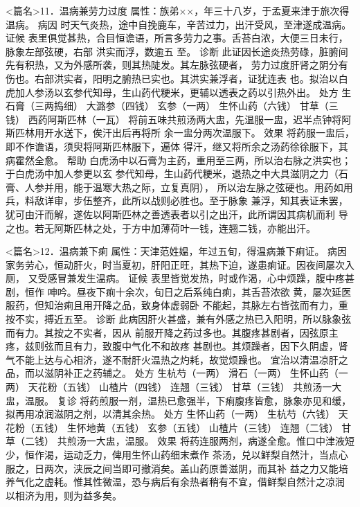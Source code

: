 \documentclass[a4paper,12pt,UTF8,twoside]{ctexbook}
\begin{document}
<篇名>11．温病兼劳力过度
属性：族弟××，年三十八岁，于孟夏来津于旅次得温病。 
病因 时天气炎热，途中自挽鹿车，辛苦过力，出汗受风，至津遂成温病。 
证候 表里俱觉甚热，合目恒谵语，所言多劳力之事。舌苔白浓，大便三日未行，脉象左部弦硬，右部 
洪实而浮，数逾五 
至。 
诊断 此证因长途炎热劳碌，脏腑间先有积热，又为外感所袭，则其热陡发。其左脉弦硬者， 
劳力过度肝肾之阴分有伤也。右部洪实者，阳明之腑热已实也。其洪实兼浮者，证犹连表 
也。拟治以白虎加人参汤以玄参代知母，生山药代粳米，更辅以透表之药以引热外出。 
处方 生石膏（三两捣细） 大潞参（四钱） 玄参（一两） 生怀山药（六钱） 
甘草（三钱） 西药阿斯匹林（一瓦） 
将前五味共煎汤两大盅，先温服一盅，迟半点钟将阿斯匹林用开水送下，俟汗出后再将所 
余一盅分两次温服下。 
效果 将药服一盅后，即不作谵语，须臾将阿斯匹林服下，遍体 
得汗，继又将所余之汤药徐徐服下，其病霍然全愈。 
帮助 白虎汤中以石膏为主药，重用至三两，所以治右脉之洪实也；于白虎汤中加人参更以玄 
参代知母，生山药代粳米，退热之中大具滋阴之力（石膏、人参并用，能于温寒大热之际，立复真阴）， 
所以治左脉之弦硬也。用药如用兵，料敌详审，步伍整齐，此所以战则必胜也。至于脉象 
兼浮，知其表证未罢，犹可由汗而解，遂佐以阿斯匹林之善透表者以引之出汗，此所谓因其病机而利 
导之也。若无阿斯匹林之处，于方中加薄荷叶一钱，连翘二钱，亦能出汗。 


<篇名>12．温病兼下痢
属性：天津范姓媪，年过五旬，得温病兼下痢证。 
病因 家务劳心，恒动肝火，时当夏初，肝阳正旺，其热下迫，遂患痢证。因夜间屡次入厕， 
又受感冒兼发生温病。 
证候 表里皆觉发热，时或作渴，心中烦躁，腹中疼甚剧，恒作 
呻吟。昼夜下痢十余次，旬日之后系纯白痢，其舌苔浓欲 
黄，屡次延医服药，但知治痢且用开降之品，致身体虚弱卧 
不能起，其脉左右皆弦而有力，重按不实，搏近五至。 
诊断 此病因肝火甚盛，兼有外感之热已入阳明，所以脉象弦而有力。其按之不实者，因从 
前服开降之药过多也。其腹疼甚剧者，因弦原主疼，兹则弦而且有力，致腹中气化不和故疼 
甚剧也。其烦躁者，因下久阴虚，肾气不能上达与心相济，遂不耐肝火温热之灼耗，故觉烦躁也。 
宜治以清温凉肝之品，而以滋阴补正之药辅之。 
处方 生杭芍（一两） 滑石（一两） 生怀山药（一两） 天花粉（五钱） 
山楂片（四钱） 连翘（三钱） 甘草（三钱） 
共煎汤一大盅，温服。 
复诊 将药煎服一剂，温热已愈强半，下痢腹疼皆愈，脉象亦见和缓，拟再用凉润滋阴之剂，以清其余热。 
处方 生怀山药（一两） 生杭芍（六钱） 天花粉（五钱） 生怀地黄（五钱） 
玄参（五钱） 山楂片（三钱） 连翘（二钱） 甘草（二钱） 
共煎汤一大盅，温服。 
效果 将药连服两剂，病遂全愈。惟口中津液短少，恒作渴，运动乏力，俾用生怀山药细末煮作 
茶汤，兑以鲜梨自然汁，当点心服之，日两次，浃辰之间当即可撤消矣。盖山药原善滋阴，而其补 
益之力又能培养气化之虚耗。惟其性微温，恐与病后有余热者稍有不宜，借鲜梨自然汁之凉润 
以相济为用，则为益多矣。 
\end{document}
